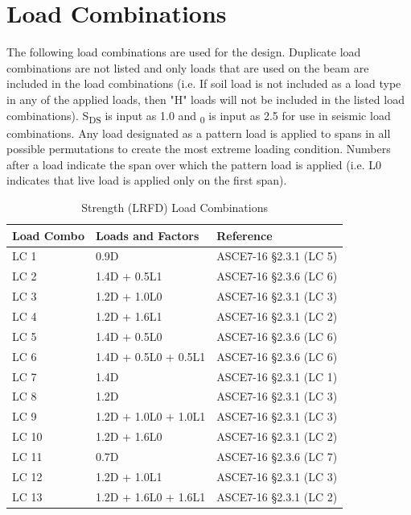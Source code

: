 \documentclass[12pt, fleqn]{article}
\begin{document}
\section{Load Combinations}
The following load combinations are used for the design. Duplicate load combinations are not listed and only loads that are used on the beam are included in the load combinations (i.e. If soil load is not included as a load type in any of the applied loads, then "H" loads will not be included in the listed load combinations). S\textsubscript{DS} is input as 1.0 and \textOmega\textsubscript{0} is input as 2.5 for use in seismic load combinations. Any load designated as a pattern load is applied to spans in all possible permutations to create the most extreme loading condition. Numbers after a load indicate the span over which the pattern load is applied (i.e. L0 indicates that live load is applied only on the first span).
\begin{table}[H]
\caption{Strength (LRFD) Load Combinations}
\centering
\begin{tabular}{l l l}
\hline
Load Combo & Loads and Factors & Reference\\
\hline
LC 1 & 0.9D & ASCE7-16 \S2.3.1 (LC 5)\\
LC 2 & 1.4D + 0.5L1 & ASCE7-16 \S2.3.6 (LC 6)\\
LC 3 & 1.2D + 1.0L0 & ASCE7-16 \S2.3.1 (LC 3)\\
LC 4 & 1.2D + 1.6L1 & ASCE7-16 \S2.3.1 (LC 2)\\
LC 5 & 1.4D + 0.5L0 & ASCE7-16 \S2.3.6 (LC 6)\\
LC 6 & 1.4D + 0.5L0 + 0.5L1 & ASCE7-16 \S2.3.6 (LC 6)\\
LC 7 & 1.4D & ASCE7-16 \S2.3.1 (LC 1)\\
LC 8 & 1.2D & ASCE7-16 \S2.3.1 (LC 3)\\
LC 9 & 1.2D + 1.0L0 + 1.0L1 & ASCE7-16 \S2.3.1 (LC 3)\\
LC 10 & 1.2D + 1.6L0 & ASCE7-16 \S2.3.1 (LC 2)\\
LC 11 & 0.7D & ASCE7-16 \S2.3.6 (LC 7)\\
LC 12 & 1.2D + 1.0L1 & ASCE7-16 \S2.3.1 (LC 3)\\
LC 13 & 1.2D + 1.6L0 + 1.6L1 & ASCE7-16 \S2.3.1 (LC 2)\\
\hline
\end{tabular}
\end{table}
\end{document}
